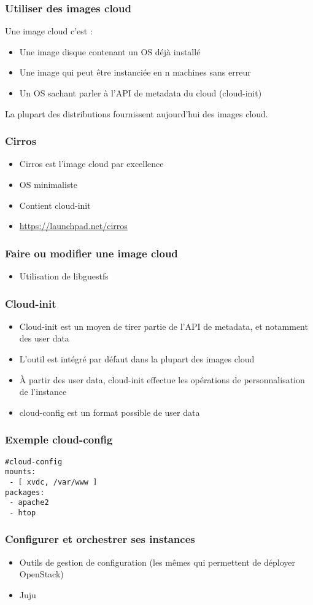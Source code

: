   \begin{frame}
    \frametitle{Utiliser des images cloud}
    Une image cloud c'est :
    \begin{itemize}
      \item Une image disque contenant un OS déjà installé
      \item Une image qui peut être instanciée en n machines sans erreur
      \item Un OS sachant parler à l'API de metadata du cloud (cloud-init)
    \end{itemize}
    La plupart des distributions fournissent aujourd'hui des images cloud.
  \end{frame}

  \begin{frame}
    \frametitle{Cirros}
    \begin{itemize}
      \item Cirros est l'image cloud par excellence
      \item OS minimaliste
      \item Contient cloud-init
      \item \url{https://launchpad.net/cirros}
    \end{itemize}
  \end{frame}

  \begin{frame}
    \frametitle{Faire ou modifier une image cloud}
    \begin{itemize}
      \item Utilisation de libguestfs
    \end{itemize}
  \end{frame}

  \begin{frame}
    \frametitle{Cloud-init}
    \begin{itemize}
      \item Cloud-init est un moyen de tirer partie de l'API de metadata, et notamment des user data
      \item L'outil est intégré par défaut dans la plupart des images cloud
      \item À partir des user data, cloud-init effectue les opérations de personnalisation de l'instance
      \item cloud-config est un format possible de user data
    \end{itemize}
  \end{frame}

  \begin{frame}[containsverbatim]
    \frametitle{Exemple cloud-config}
\begin{verbatim}
#cloud-config
mounts:
 - [ xvdc, /var/www ]
packages:
 - apache2
 - htop
\end{verbatim}
  \end{frame}

  \begin{frame}
    \frametitle{Configurer et orchestrer ses instances}
    \begin{itemize}
      \item Outils de gestion de configuration (les mêmes qui permettent de déployer OpenStack)
      \item Juju
    \end{itemize}
  \end{frame}
